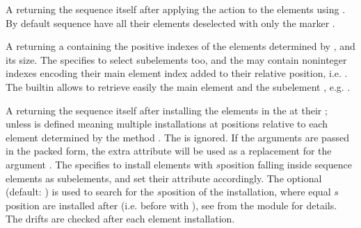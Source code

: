 \documentclass[letterpaper,10pt,english]{sphinxmanual}
\begin{document}
\begin{description}
\sphinxAtStartPar
A  \sphinxcode{\sphinxupquote{({[}flg{]}, {[}rng{]}, {[}sel{]}, {[}not{]})}} returning the sequence itself after applying the action  to the elements
using . By default sequence have all their elements deselected with only the  marker .

\sphinxAtStartPar
A  \sphinxcode{\sphinxupquote{({[}rng{]}, {[}sel{]}, {[}not{]})}} returning a  containing the positive indexes of the elements determined by ,
and its size. The   specifies to select sub\sphinxhyphen{}elements too, and the  may contain non\sphinxhyphen{}integer indexes encoding their main element
index added to their relative position, i.e. . The builtin   allows to retrieve easily the main element  and
the sub\sphinxhyphen{}element , e.g. .

\sphinxAtStartPar
A   returning the sequence itself after installing the elements in the   at their
{\hyperref[\detokenize{sequences:element-positions}]{}}; unless  is defined meaning multiple installations at positions relative to each element determined by the method
. The   is ignored. If the arguments are passed in the packed form, the extra attribute 
will be used as a replacement for the argument . The   specifies to install elements with \(s\)\sphinxhyphen{}position falling inside
sequence elements as sub\sphinxhyphen{}elements, and set their  attribute accordingly. The optional   (default: ) is used
to search for the \(s\)\sphinxhyphen{}position of the installation, where equal \(s\)\sphinxhyphen{}position are installed after (i.e. before with ), see  from
the {\hyperref[\detokenize{utility::doc}]{}} module for details. The  drifts are checked after each element installation.


\end{description}
\end{document}
